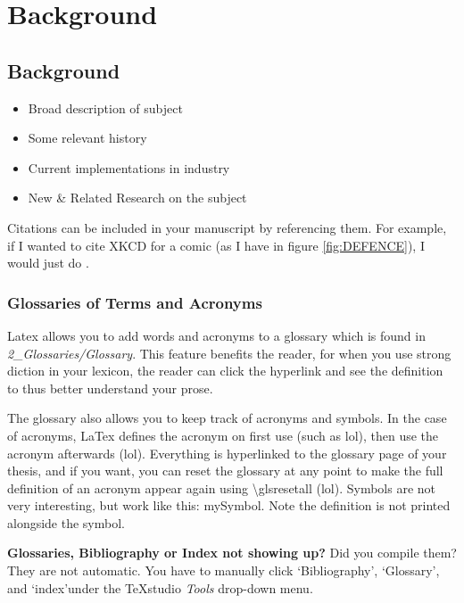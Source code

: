 
\glsresetall %
\chapter[Background]{Background}\label{ch:Background}

\section{Background}
\begin{itemize}
	\item{Broad description of subject}
	\item{Some relevant history}
	\item{Current implementations in industry}
	\item{New \& Related Research on the subject}
\end{itemize}

Citations can be included in your manuscript by referencing them. For example, if I wanted to cite XKCD for a comic (as I have in figure \ref{fig:DEFENCE}), I would just do \cite{xkcdThesis}.

\subsection[Glossaries]{Glossaries of Terms and Acronyms}

Latex allows you to add words and acronyms to a glossary which is found in \textit{2\_Glossaries/Glossary}. This feature benefits the reader, for when you use strong \gls{diction} in your \gls{lexicon}, the reader can click the hyperlink and see the definition to thus better understand your \gls{prose}.

The glossary also allows you to keep track of acronyms and symbols. In the case of acronyms, LaTex defines the acronym on first use (such as \gls{lol}), then use the acronym afterwards (\gls{lol}). 
\glsresetall %
Everything is hyperlinked to the glossary page of your thesis, and if you want, you can reset the glossary at any point to make the full definition of an acronym appear again using \textbackslash glsresetall (\gls{lol}). Symbols are not very interesting, but work like this: \gls{mySymbol}. Note the definition is not printed alongside the symbol.

\textbf{Glossaries, Bibliography or Index not showing up?}
Did you compile them? They are not automatic. You have to manually click \lq Bibliography\rq, \lq Glossary\rq, and \lq index\rq under the TeXstudio \textit{Tools} drop-down menu. 
